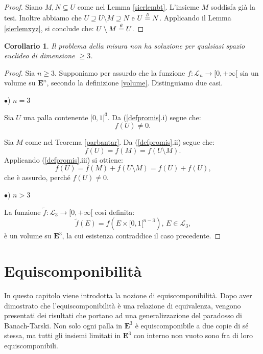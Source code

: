 \documentclass[a4paper,oneside,11pt]{book}
\theoremstyle{definition} \newtheorem{Def}{Definizione}
\theoremstyle{plain} \newtheorem{teo}{Teorema}
\theoremstyle{plain} \newtheorem{cor}[teo]{Corollario}
\theoremstyle{definition} \newtheorem{lem}[teo]{Lemma}
\theoremstyle{plain} \newtheorem{pro}[teo]{Proposizione}
\newcommand{\eqn}[1]{\stackrel{\text{\textit{#1}}}{=}}
\begin{document}
	\begin{proof}
		Siano $M,N \subseteq U$ come nel Lemma \ref{sierlembt}. L'insieme $M$ soddisfa già la tesi. Inoltre abbiamo che $U \supseteq U \setminus M \supseteq N$ e $U \eqn{5} N$. Applicando il Lemma \ref{sierlemxyz}, si conclude che: $U \setminus M \eqn{6} U$.
	\end{proof}
	
	\begin{cor}
		Il problema della misura non ha soluzione per qualsiasi spazio euclideo di dimensione $\geq 3$.
	\end{cor}
	
	\begin{proof}
		Sia $n \geq 3$. Supponiamo per assurdo che la funzione $f: \mathcal{L}_n \to [0, +\infty[$ sia un volume su $\mathbf{E}^n$, secondo la definizione \ref{volume}. Distinguiamo due casi. %
		
		$\bullet$) $n = 3$
		
		Sia $U$ una palla contenente $[0,1[^3$. Da (\ref{defpromis}.i) segue che:
		\begin{equation*}
			f(U) \neq 0 \text{.}
		\end{equation*} 
		
		Sia $M$ come nel Teorema \ref{parbantar}.  Da (\ref{defpromis}.ii) segue che:
		\begin{equation*}
			f(U) = f(M) = f(U \setminus M) \text{.}
		\end{equation*}
		Applicando (\ref{defpromis}.iii) si ottiene:
		\begin{equation*}
			f(U) = f(M) + f(U \setminus M) = f(U) + f(U) \text{,}
		\end{equation*}
		che è assurdo, perché $f(U) \neq 0$. \lightning
		
		$\bullet$) $n > 3$
		 
		La funzione $\tilde{f}: \mathcal{L}_3 \to [0, +\infty[$ così definita:
		\begin{equation*}
			\tilde{f}(E) = f(E \times [0,1[^{n-3})\text{, } E \in \mathcal{L}_3 \text{,}
		\end{equation*}
		è un volume su $\mathbf{E}^3$, la cui esistenza contraddice il caso precedente. \lightning
	\end{proof}	
		
	
\chapter{Equiscomponibilità}

	In questo capitolo viene introdotta la nozione di equiscomponibilità. Dopo aver dimostrato che l'equiscomponibilità è una relazione di equivalenza, vengono presentati dei risultati che portano ad una generalizzazione del paradosso di Banach-Tarski. Non solo ogni palla in $\mathbf{E}^3$ è equiscomponibile a due copie di sé stessa, ma tutti gli insiemi limitati in $\mathbf{E}^3$ con interno non vuoto sono fra di loro equiscomponibili.
	
\end{document}
